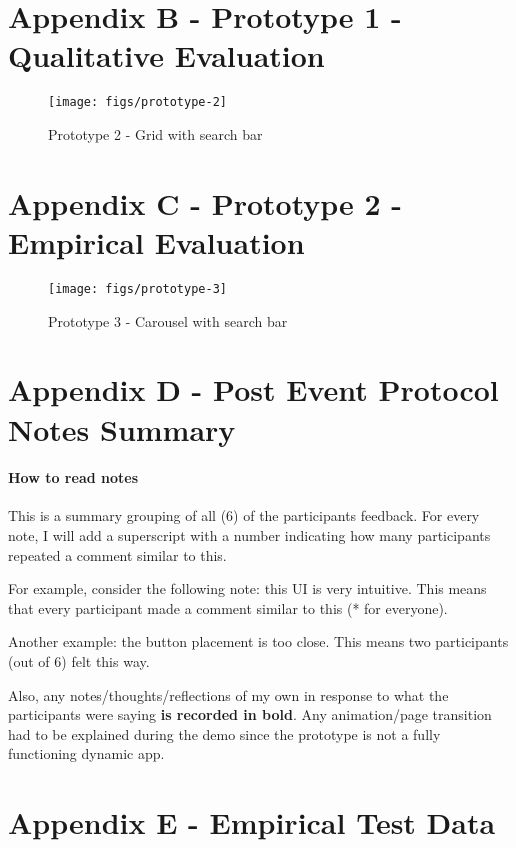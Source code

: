 \section{Appendix B - Prototype 1 - Qualitative Evaluation}

\begin{figure}[H]
  \centering
  \texttt{[image: figs/prototype-2]}
  \caption{Prototype 2 - Grid with search bar}
  \label{fig::1}
\end{figure}

\section{Appendix C - Prototype 2 - Empirical Evaluation}

\begin{figure}[H]
  \centering
  \texttt{[image: figs/prototype-3]}
  \caption{Prototype 3 - Carousel with search bar}
  \label{fig::1}
\end{figure}

\section{Appendix D - Post Event Protocol Notes Summary}

\paragraph{How to read notes} This is a summary grouping of all (6) of the participants feedback. For every note, I will add a superscript with a number indicating how many participants repeated a comment similar to this.

For example, consider the following note: this UI is very intuitive\super{*}. This means that every participant made a comment similar to this (* for everyone).

Another example: the button placement is too close. This means two participants (out of 6) felt this way.

Also, any notes/thoughts/reflections of my own in response to what the participants were saying \textbf{is recorded in bold}. Any animation/page transition had to be explained during the demo since the prototype is not a fully functioning dynamic app.

\section{Appendix E - Empirical Test Data}


